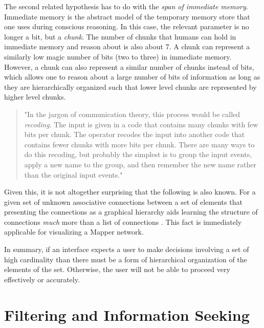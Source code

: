 The second related hypothesis has to do with the \emph{span of immediate memory}. Immediate memory is the abstract model of the temporary memory store that one uses during conscious reasoning. In this case, the relevant parameter is no longer a bit, but a \emph{chunk}. The number of chunks that humans can hold in immediate memory and reason about is also about 7. A chunk can represent a similarly low magic number of bits (two to three) in immediate memory. However, a chunk can also represent a similar number of chunks instead of bits, which allows one to reason about a large number of bits of information as long as they are hierarchically organized such that lower level chunks are represented by higher level chunks.

\begin{quote}
"In the jargon of communication theory, this process would be called \emph{recoding}. The input is given in a code that contains many chunks with few bits per chunk. The operator recodes the input into another code that contains fewer chunks with more bits per chunk. There are many ways to do this recoding, but probably the simplest is to group the input events, apply a new name to the group, and then remember the new name rather than the original input events." \cite{seven1956}
\end{quote}

Given this, it is not altogether surprising that the following is also known. For a given set of unknown associative connections between a set of elements that presenting the connections as a graphical hierarchy aids learning the structure of connections \emph{much} more than a list of connections \cite{graphicalhierarchy1972}. This fact is immediately applicable for visualizing a Mapper network.

In summary, if an interface expects a user to make decisions involving a set of high cardinality than there must be a form of hierarchical organization of the elements of the set. Otherwise, the user will not be able to proceed very effectively or accurately.

\section{Filtering and Information Seeking}

\begin{comment}
The Structure of the Information Visualization Design Space, Section 5
dynamic queries technique 

Visual Information Seeking: Tight Coupling of Dynamic Query Filters with Starfield Displays
\end{comment}

